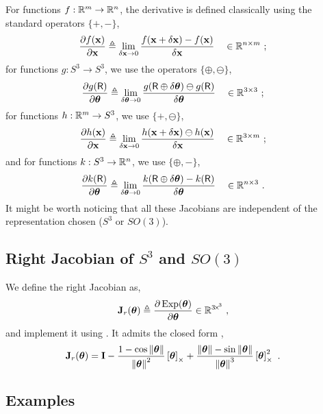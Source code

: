 For functions $f:{\mathbb R}^m\to{\mathbb R}^n$, the derivative is defined classically using the standard operators $\{+,-\}$,
%
\begin{align}\label{equ:derivative_vector}
\frac{\partial f({\bf x})}{\partial{\bf x}} &\triangleq \lim_{\delta{\bf x}\to0}\frac{f({\bf x}+\delta{\bf x})-f({\bf x})}{\delta{\bf x}} &&\in {\mathbb R}^{n\times m} 
~;
\end{align}
%
for functions $g:S^3\to S^3$, we use the operators $\{\oplus,\ominus\}$,
%
\begin{align}\label{equ:derivative_SO3}
\frac{\partial g(\mathsf R)}{\partial{{\bm \theta}}} 
&\triangleq \lim_{\delta{{\bm \theta}}\to0}\frac{g(\mathsf R\oplus\delta{{\bm \theta}})\ominus g(\mathsf R)}{\delta{{\bm \theta}}}  && \in {\mathbb R}^{3\times 3}
~;
\end{align}
%
for functions $h:{\mathbb R}^m \to S^3$, we use $\{+,\ominus\}$,
%
\begin{align}\label{equ:dif_RtoSO3}
\frac{\partial h({\bf x})}{\partial{\bf x}} &\triangleq \lim_{\delta{\bf x}\to0} \frac{ h({\bf x}+\delta{\bf x})\ominus h({\bf x})}{\delta{\bf x}} && \in {\mathbb R}^{3\times m} 
~;
\end{align}
%
and for functions $k:S^3\to{\mathbb R}^n$, we use $\{\oplus,-\}$,
%
\begin{align}\label{equ:jacobian_SO3_Rn}
\frac{\partial k(\mathsf R)}{\partial{{\bm \theta}}} &\triangleq \lim_{\delta{{\bm \theta}}\to0} \frac{k(\mathsf R\oplus\delta{{\bm \theta}}) - k(\mathsf R)}{\delta{{\bm \theta}}} && \in {\mathbb R}^{n\times 3} 
~.
\end{align}
%
It might be worth noticing that all these Jacobians are independent of the representation chosen ($S^3$ or $SO(3)$).


\subsection{Right Jacobian of $S^3$ and $SO(3)$}

We define the right Jacobian as, 
%
\begin{align}\label{equ:Jr}
{\bf J}_r({{\bm \theta}}) &\triangleq \frac{\partial\operatorname*{Exp}({{\bm \theta}})}{\partial{{\bm \theta}}} 
\in{\mathbb R}^{3\!\times\!^3}
~,
\end{align}
%
and implement it using .
It admits the closed form  \cite[pag.~40]{CHIRIKJIAN-12}, 
%
\begin{align}
{\bf J}_r({{\bm \theta}}) &= {\bf I} - \frac{1-\cos{\left\|{{\bm \theta}}\right\|}}{{\left\|{{\bm \theta}}\right\|}^2}\left[{{\bm \theta}}\right]_\times + \frac{{\left\|{{\bm \theta}}\right\|}-\sin{\left\|{{\bm \theta}}\right\|}}{{\left\|{{\bm \theta}}\right\|}^3}\left[{{\bm \theta}}\right]_\times^2 
~.
\end{align}



\subsection{Examples}

